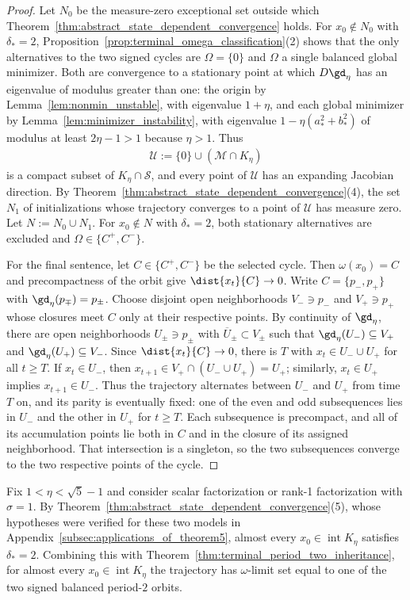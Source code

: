 \documentclass{article}
\begin{document}
\begin{proof}
Let $N_0$ be the measure-zero exceptional set outside which
Theorem~\ref{thm:abstract_state_dependent_convergence} holds.
For $x_0\notin N_0$ with $\delta_\ast=2$,
Proposition~\ref{prop:terminal_omega_classification}(2) shows that the only
alternatives to the two signed cycles are $\Omega=\{0\}$ and $\Omega$ a single
balanced global minimizer. Both are convergence to a stationary point at which
$D\gd_\eta$ has an eigenvalue of modulus greater than one: the origin by
Lemma~\ref{lem:nonmin_unstable}, with eigenvalue $1+\eta$, and each global minimizer by
Lemma~\ref{lem:minimizer_instability}, with eigenvalue
$1-\eta(a_\ast^2+b_\ast^2)$ of modulus at least $2\eta-1>1$ because $\eta>1$.
Thus
\begin{align}
    \mathcal U:=\{0\}\cup(\mathcal M\cap K_\eta)
\end{align}
is a compact subset of $K_\eta\cap\mathcal S$, and every point of $\mathcal U$
has an expanding Jacobian direction. By
Theorem~\ref{thm:abstract_state_dependent_convergence}(4), the set $N_1$ of
initializations whose trajectory converges to a point of $\mathcal U$ has
measure zero. Let $N:=N_0\cup N_1$. For $x_0\notin N$ with $\delta_\ast=2$,
both stationary alternatives are excluded and
$\Omega\in\{C^+,C^-\}$.

For the final sentence, let $C\in\{C^+,C^-\}$ be the selected cycle.
Then $\omega(x_0)=C$ and precompactness of the orbit give
$\dist{x_t}{C}\to0$. Write $C=\{p_-,p_+\}$ with
$\gd_\eta(p_\mp)=p_\pm$. Choose disjoint open neighborhoods $V_-\ni p_-$ and
$V_+\ni p_+$ whose closures meet $C$ only at their respective points. By
continuity of $\gd_\eta$, there are open neighborhoods $U_\pm\ni p_\pm$ with
$\overline U_\pm\subset V_\pm$ such that
$\gd_\eta(U_-)\subseteq V_+$ and $\gd_\eta(U_+)\subseteq V_-$. Since
$\dist{x_t}{C}\to0$, there is $T$ with $x_t\in U_-\cup U_+$ for all $t\ge T$.
If $x_t\in U_-$, then $x_{t+1}\in V_+\cap(U_-\cup U_+)=U_+$; similarly,
$x_t\in U_+$ implies $x_{t+1}\in U_-$. Thus the trajectory alternates between
$U_-$ and $U_+$ from time $T$ on, and its parity is eventually fixed: one of
the even and odd subsequences lies in $U_-$ and the other in $U_+$ for $t\ge T$.
Each subsequence is precompact, and all of its accumulation points lie both in
$C$ and in the closure of its assigned neighborhood. That intersection is
a singleton, so the two subsequences converge to the two respective points of
the cycle.
\end{proof}

\begin{corollary}
\label{cor:theorem_five_period_two_inheritance}
Fix $1<\eta<\sqrt5-1$ and consider scalar factorization or rank-1
factorization with $\sigma=1$. By
Theorem~\ref{thm:abstract_state_dependent_convergence}(5), whose hypotheses were
verified for these two models in
Appendix~\ref{subsec:applications_of_theorem5}, almost every
$x_0\in\operatorname{int}K_\eta$ satisfies $\delta_\ast=2$. Combining this with
Theorem~\ref{thm:terminal_period_two_inheritance}, for almost every
$x_0\in\operatorname{int}K_\eta$ the trajectory has $\omega$-limit set equal to
one of the two signed balanced period-$2$ orbits.
\end{corollary}
\end{document}
